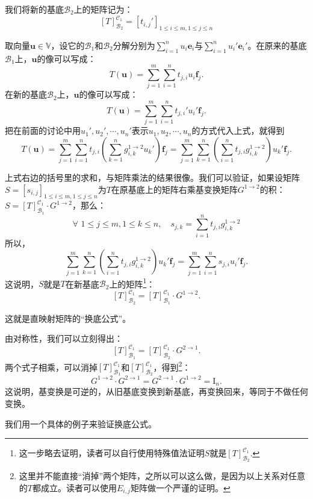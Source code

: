 \documentclass[12pt,UTF8,fontset=none]{ctexbook}
\begin{document}
我们将新的基底$\mathcal{B}_2$上的矩阵记为：
$$[T]_{\mathcal{B}_2}^{\mathcal{C}_1} = [t_{i, j}']_{1\leqslant i \leqslant m, 1\leqslant j \leqslant n}$$

取向量$\mathbf{u} \in \mathbb{V}$，设它的$\mathcal{B}_1$和$\mathcal{B}_2$分解分别为$\sum_{i=1}^n u_i\mathbf{e}_i $与$\sum_{i=1}^n u_i'\mathbf{e}_i' $。在原来的基底$\mathcal{B}_1$上，$\mathbf{u}$的像可以写成：
$$T(\mathbf{u}) = \sum_{j=1}^m \sum_{i=1}^n t_{j,i} u_i \mathbf{f}_j.$$
在新的基底$\mathcal{B}_2$上，$\mathbf{u}$的像可以写成：
$$T(\mathbf{u}) = \sum_{j=1}^m \sum_{i=1}^n t_{j,i}' u_i' \mathbf{f}_j.$$
把在前面的讨论中用$u_1', u_2', \cdots, u_n'$表示$u_1, u_2, \cdots, u_n$的方式代入上式，就得到
$$T(\mathbf{u}) = \sum_{j=1}^m \sum_{i=1}^n t_{j,i}\left(\sum_{k=1}^n g_{i,k}^{1\rightarrow 2} u_k'\right) \mathbf{f}_j = \sum_{j=1}^m \sum_{k=1}^n \left(\sum_{i=1}^n t_{j,i} g_{i,k}^{1\rightarrow 2}\right) u_k' \mathbf{f}_j.$$

上式右边的括号里的求和，与矩阵乘法的结果很像。我们可以验证，如果设矩阵$S = [s_{i, j}]_{1\leqslant i \leqslant m, 1\leqslant j \leqslant n}$为$T$在原基底上的矩阵右乘基变换矩阵$G^{1\rightarrow 2}$的积：$S = [T]_{\mathcal{B}_1}^{\mathcal{C}_1} \cdot G^{1\rightarrow 2}$，那么：
$$\forall \,\,1\leqslant j \leqslant m, 1\leqslant k \leqslant n, \quad s_{j, k} = \sum_{i=1}^n t_{j,i} g_{i,k}^{1\rightarrow 2}$$
所以，
$$\sum_{j=1}^m \sum_{k=1}^n \left(\sum_{i=1}^n t_{j,i} g_{i,k}^{1\rightarrow 2}\right) u_k' \mathbf{f}_j = \sum_{j=1}^m \sum_{i=1}^n s_{j,i} u_i' \mathbf{f}_j.$$
这说明，$S$就是$T$在新基底$\mathcal{B}_2$上的矩阵\footnote{这一步略去证明，读者可以自行使用特殊值法证明$S$就是$[T]_{\mathcal{B}_2}^{\mathcal{C}_1}$.}：
$$[T]_{\mathcal{B}_2}^{\mathcal{C}_1} = [T]_{\mathcal{B}_1}^{\mathcal{C}_1} \cdot G^{1\rightarrow 2}.$$

这就是直映射矩阵的“换底公式”。

由对称性，我们可以立刻得出：
$$[T]_{\mathcal{B}_1}^{\mathcal{C}_1} = [T]_{\mathcal{B}_2}^{\mathcal{C}_1} \cdot G^{2\rightarrow 1}.$$
两个式子相乘，可以消掉$[T]_{\mathcal{B}_1}^{\mathcal{C}_1}$和$[T]_{\mathcal{B}_2}^{\mathcal{C}_1}$，得到\footnote{这里并不能直接“消掉”两个矩阵，之所以可以这么做，是因为以上关系对任意的$T$都成立。读者可以使用$E_{i,j}$矩阵做一个严谨的证明。}：
$$G^{1\rightarrow 2} \cdot G^{2\rightarrow 1} = G^{2\rightarrow 1} \cdot G^{1\rightarrow 2} = \mathrm{I}_n.$$
这说明，基变换是可逆的，从旧基底变换到新基底，再变换回来，等同于不做任何变换。

我们用一个具体的例子来验证换底公式。
\end{document}
